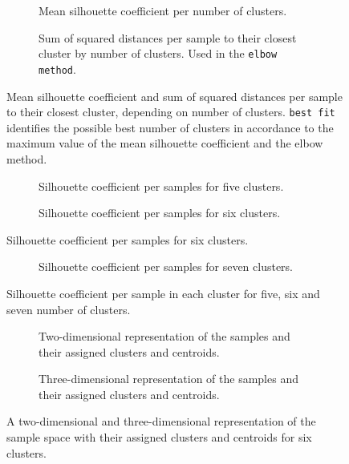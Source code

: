 \begin{figure}
	\begin{subfigure}[b]{\textwidth}
		
		\caption{Mean silhouette coefficient per number of clusters.}
	\end{subfigure}
	\begin{subfigure}[b]{\textwidth}
		
		\caption{Sum of squared distances per sample to their closest cluster by number of clusters. Used in the \texttt{elbow method}.}
	\end{subfigure}
	\caption{Mean silhouette coefficient and sum of squared distances per sample to their closest cluster, depending on number of clusters. \texttt{best fit} identifies the possible best number of clusters in accordance to the maximum value of the mean silhouette coefficient and the elbow method.}
	\label{fig:kmeans_score}
\end{figure}

\begin{figure}
	\begin{subfigure}[b]{\textwidth}
		
		\caption{Silhouette coefficient per samples for five clusters.}
	\end{subfigure}
	\begin{subfigure}[b]{\textwidth}
		
		\caption{Silhouette coefficient per samples for six clusters.}
	\end{subfigure}
\end{figure}
\begin{figure}
	\ContinuedFloat
	\begin{subfigure}[b]{\textwidth}
		
		\caption{Silhouette coefficient per samples for seven clusters.}
	\end{subfigure}
	\caption{Silhouette coefficient per sample in each cluster for five, six and seven number of clusters.}
	\label{fig:silhouette_coef}
\end{figure}

\begin{figure}
	\begin{subfigure}[b]{\textwidth}
		
		\caption{Two-dimensional representation of the samples and their assigned clusters and centroids.}
	\end{subfigure}
	\begin{subfigure}[b]{\textwidth}
		
		\caption{Three-dimensional representation of the samples and their assigned clusters and centroids.}
	\end{subfigure}
	\caption{A two-dimensional and three-dimensional representation of the sample space with their assigned clusters and centroids for six clusters.}
	\label{fig:clusters}
\end{figure}


